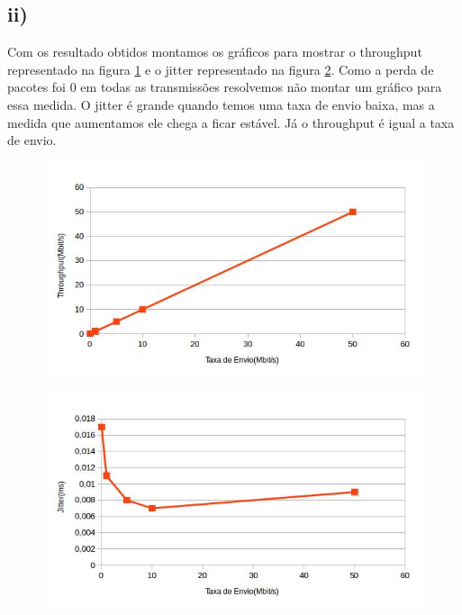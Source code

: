 \documentclass[12pt]{article}
\begin{document}
\subsection{ii)}
Com os resultado obtidos montamos os gráficos para mostrar o throughput representado na figura \ref{1iia} e o jitter representado na figura \ref{1iib}. Como a perda de pacotes foi 0 em todas as transmissões resolvemos não montar um gráfico para essa medida. O jitter é grande quando temos uma taxa de envio baixa, mas a medida que aumentamos ele chega a ficar estável. Já o throughput é igual a taxa de envio.   
\begin{figure}[ht]
\centering
\includegraphics[scale=0.5]{segundothr.jpg}
\caption{}
\label{1iia}
\end{figure}

\begin{figure}[ht]
\centering
\includegraphics[scale=0.5]{segundojitt.jpg}
\caption{}
\label{1iib}
\end{figure}

\newpage{}
\section{}
\end{document}
